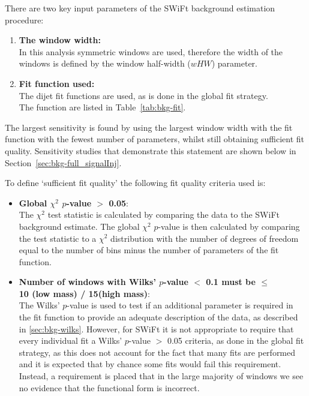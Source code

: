 There are two key input parameters of the SWiFt background estimation procedure:
\begin{enumerate}[leftmargin=*]
\item \textbf{The window width:}\\
  In this analysis symmetric windows are used, therefore the width of the windows is defined by the window half-width ($wHW$) parameter.\vspace{0.5em}
\item \textbf{Fit function used:}\\
  The dijet fit functions are used, as is done in the global fit strategy. \\The function are listed in Table~\ref{tab:bkg-fit}.
\end{enumerate}
The largest sensitivity is found by using the largest window width with the fit function with the fewest number of parameters, whilst still obtaining sufficient fit quality.
Sensitivity studies that demonstrate this statement are shown below in Section~\ref{sec:bkg-full_signalInj}.

\noindent
To define `sufficient fit quality' the following fit quality criteria used is:
\begin{itemize}[leftmargin=*]
  
\item \textbf{Global $\chi^{2}$ \mbox{$p$-value} $>$ 0.05}:\\
  The $\chi^{2}$ test statistic is calculated by comparing the data to the SWiFt background estimate.
  The global $\chi^{2}$ \mbox{$p$-value} is then calculated by comparing the test statistic
  to a $\chi^{2}$ distribution with the number of degrees of freedom equal to the number of bins
  minus the number of parameters of the fit function.\vspace{0.5em}
\item \textbf{Number of windows with Wilks' \mbox{$p$-value} $<$ 0.1 must be $\leq$ \\10 (low mass) / 15(high mass)}:\\
  The Wilks' \mbox{$p$-value} is used to test if an additional parameter is required in the fit function
  to provide an adequate description of the data, as described in \ref{sec:bkg-wilks}. 
  However, for SWiFt it is not appropriate to require that every individual fit a Wilks' $p$-value $>$ 0.05 criteria, as done in the global fit strategy,
  as this does not account for the fact that many fits are performed and it is expected that by chance some fits would fail this requirement.
  Instead, a requirement is placed that in the large majority of windows we see no evidence that the functional form is incorrect.
\end{itemize}

